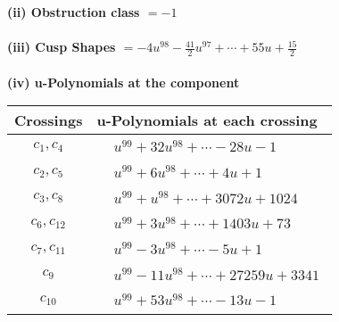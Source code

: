 \documentclass[1p]{elsarticle_modified}
\theoremstyle{definition}
\begin{document}
\flushleft \textbf{(ii) Obstruction class $= -1$}\\~\\
\flushleft \textbf{(iii) Cusp Shapes $= -4 u^{98}-\frac{41}{2} u^{97}+\cdots+55 u+\frac{15}{2}$}\\~\\
\newpage\renewcommand{\arraystretch}{1}
\flushleft \textbf{(iv) u-Polynomials at the component}\newline \\
\begin{tabular}{m{50pt}|m{274pt}}
Crossings & \hspace{64pt}u-Polynomials at each crossing \\
\hline $$\begin{aligned}c_{1},c_{4}\end{aligned}$$&$\begin{aligned}
&u^{99}+32 u^{98}+\cdots-28 u-1
\end{aligned}$\\
\hline $$\begin{aligned}c_{2},c_{5}\end{aligned}$$&$\begin{aligned}
&u^{99}+6 u^{98}+\cdots+4 u+1
\end{aligned}$\\
\hline $$\begin{aligned}c_{3},c_{8}\end{aligned}$$&$\begin{aligned}
&u^{99}+u^{98}+\cdots+3072 u+1024
\end{aligned}$\\
\hline $$\begin{aligned}c_{6},c_{12}\end{aligned}$$&$\begin{aligned}
&u^{99}+3 u^{98}+\cdots+1403 u+73
\end{aligned}$\\
\hline $$\begin{aligned}c_{7},c_{11}\end{aligned}$$&$\begin{aligned}
&u^{99}-3 u^{98}+\cdots-5 u+1
\end{aligned}$\\
\hline $$\begin{aligned}c_{9}\end{aligned}$$&$\begin{aligned}
&u^{99}-11 u^{98}+\cdots+27259 u+3341
\end{aligned}$\\
\hline $$\begin{aligned}c_{10}\end{aligned}$$&$\begin{aligned}
&u^{99}+53 u^{98}+\cdots-13 u-1
\end{aligned}$\\
\hline
\end{tabular}\\~\\
\end{document}
